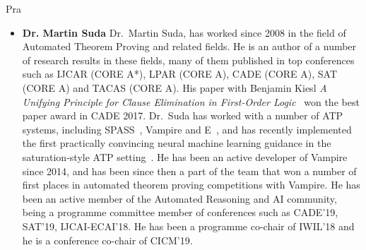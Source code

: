\begin{sitedescription}{Pra}
\begin{itemize}
\item \textbf{Dr. Martin Suda}
Dr.~Martin Suda, has worked since 2008 in the field of
Automated Theorem Proving and related fields.  He is an author of a number of research
results in these fields, many of them published in top conferences such
as IJCAR (CORE A*), LPAR (CORE A), CADE (CORE A), SAT (CORE A) and TACAS (CORE A).  His paper
with Benjamin Kiesl \emph{A Unifying Principle for Clause Elimination
  in First-Order Logic}~\cite{DBLP:conf/cade/Kiesl017} won the best
paper award in CADE 2017.
Dr.~Suda has worked with a number of ATP systems, including
SPASS~\cite{WeidenbachDFKSW09}, Vampire and E~\cite{Schulz13}, and has recently implemented the first practically convincing neural machine learning guidance in the saturation-style ATP setting~\cite{abs-1903-03182}. He has
been an active developer of Vampire since 2014, and has been since
then a part of the team that won a number of first places in automated
theorem proving competitions with Vampire.
He has been an active member of the Automated Reasoning and AI
community, being a programme committee member of conferences such as
CADE'19, SAT'19, IJCAI-ECAI'18. He has been a programme co-chair of IWIL'18 and he is a
conference co-chair of CICM'19.
\end{itemize}


\begin{itemize}
 

\end{itemize}
\end{sitedescription}
